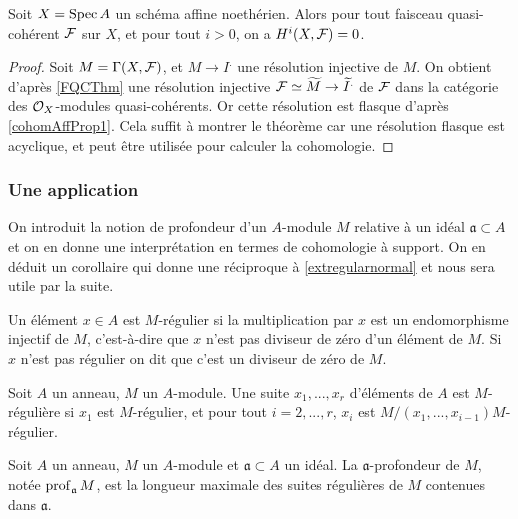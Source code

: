 \begin{thm}\label{cohomoaffine}
Soit $X=\operatorname{Spec} A$ un schéma affine noethérien. Alors pour tout faisceau quasi-cohérent $\mathcal{F}$ sur $X$, et pour tout $i>0$, on a $H^i(X,\mathcal{F})=0$. 
\end{thm}
\begin{proof}
Soit $M=\Gamma(X,\mathcal{F})$, et $M\rightarrow I^.$ une résolution injective de $M$. On obtient d'après \ref{FQCThm} une résolution injective $\mathcal{F}\simeq \widetilde{M}\rightarrow \widetilde{I}^.$ de $\mathcal{F}$ dans la catégorie des $\mathcal{O}_X$-modules quasi-cohérents. Or cette résolution est flasque d'après \ref{cohomAffProp1}. Cela suffit à montrer le théorème car une résolution flasque est acyclique, et peut être utilisée pour calculer la cohomologie.
\end{proof}

\subsubsection{Une application}

On introduit la notion de profondeur d'un $A$-module $M$ relative à un idéal $\mathfrak{a}\subset A$ et on en donne une interprétation en termes de cohomologie à support. On en déduit un corollaire qui donne une réciproque à \ref{extregularnormal} et nous sera utile par la suite.

\begin{defn}
Un élément $x\in A$ est $M$-régulier si la multiplication par $x$ est un endomorphisme injectif de $M$, c'est-à-dire que $x$ n'est pas diviseur de zéro d'un élément de $M$. Si $x$ n'est pas régulier on dit que c'est un diviseur de zéro de $M$.
\end{defn}

\begin{defn}
Soit $A$ un anneau, $M$ un $A$-module. Une suite $x_1,...,x_r$ d'éléments de $A$ est $M$-régulière si $x_1$ est $M$-régulier, et pour tout $i=2,...,r$, $x_i$ est $M/(x_1,...,x_{i-1})M$-régulier.
\end{defn}

\begin{defn}[Profondeur]
Soit $A$ un anneau, $M$ un $A$-module et $\mathfrak{a}\subset A$ un idéal. La $\mathfrak{a}$-profondeur de $M$, notée $\operatorname{prof}_\mathfrak{a} M$, est la longueur maximale des suites régulières de $M$ contenues dans $\mathfrak{a}$.
\end{defn}


